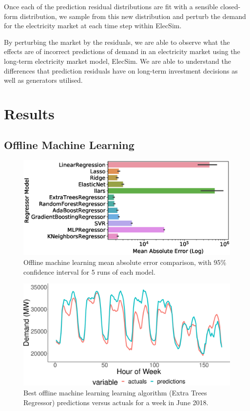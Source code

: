 \documentclass[final,3p,times,twocolumn,numbers]{elsarticle}
\begin{document}
Once each of the prediction residual distributions are fit with a sensible closed-form distribution, we sample from this new distribution and perturb the demand for the electricity market at each time step within ElecSim.

By perturbing the market by the residuals, we are able to observe what the effects are of incorrect predictions of demand in an electricity market using the long-term electricity market model, ElecSim. We are able to understand the differences that prediction residuals have on long-term investment decisions as well as generators utilised.




\section{Results}
\label{sec:results}



\subsection{Offline Machine Learning}


\begin{figure}
\centering
\includegraphics[width=\columnwidth]{figures/results/offline_model_mae.eps}
\caption{Offline machine learning mean absolute error comparison, with 95\% confidence interval for 5 runs of each model.}
\label{fig:beis_elecsim_historic_comparison}
\end{figure}


\begin{figure}
\centering
\includegraphics[width=\columnwidth]{figures/results/offline_rf_actual_predicted.eps}
\caption{Best offline machine learning learning algorithm (Extra Trees Regressor) predictions versus actuals for a week in June 2018.}
\label{fig:best_offline_learning_day_simulation}
\end{figure}
\end{document}
